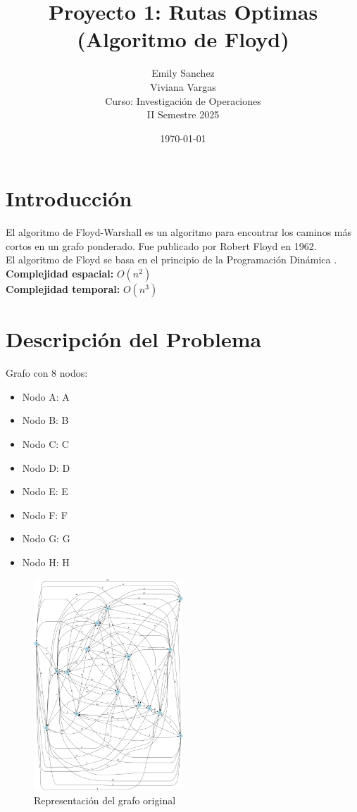 \documentclass[12pt]{article}
\title{Proyecto 1: Rutas Optimas (Algoritmo de Floyd)}
\author{Emily Sanchez \\ Viviana Vargas \\[1cm] Curso: Investigación de Operaciones \\ II Semestre 2025}
\date{\today}
\begin{document}
\maketitle
\thispagestyle{empty}
\newpage
\setcounter{page}{1}

\section{Introducción}
El algoritmo de Floyd-Warshall es un algoritmo para encontrar los caminos más cortos en un grafo ponderado. Fue publicado por Robert Floyd en 1962.\\
El algoritmo de Floyd se basa en el principio de la Programación Dinámica .\\
\textbf{Complejidad espacial:} $O(n^2)$\\
\textbf{Complejidad temporal:} $O(n^3)$\\
\clearpage
\section{Descripción del Problema}
Grafo con 8 nodos:

\begin{itemize}
\item Nodo A: A
\item Nodo B: B
\item Nodo C: C
\item Nodo D: D
\item Nodo E: E
\item Nodo F: F
\item Nodo G: G
\item Nodo H: H
\end{itemize}

\begin{figure}[h!]
\centering
\includegraphics[width=0.5\textwidth,keepaspectratio]{grafo.png}
\caption{Representación del grafo original}
\end{figure}
\end{document}

